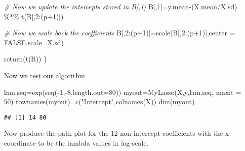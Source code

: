 \documentclass[
]{article}
\newenvironment{Shaded}{\begin{snugshade}}{\end{snugshade}}
\newcommand{\AttributeTok}[1]{\textcolor[rgb]{0.77,0.63,0.00}{#1}}
\newcommand{\CommentTok}[1]{\textcolor[rgb]{0.56,0.35,0.01}{\textit{#1}}}
\newcommand{\ConstantTok}[1]{\textcolor[rgb]{0.00,0.00,0.00}{#1}}
\newcommand{\DecValTok}[1]{\textcolor[rgb]{0.00,0.00,0.81}{#1}}
\newcommand{\FunctionTok}[1]{\textcolor[rgb]{0.00,0.00,0.00}{#1}}
\newcommand{\NormalTok}[1]{#1}
\newcommand{\OtherTok}[1]{\textcolor[rgb]{0.56,0.35,0.01}{#1}}
\newcommand{\SpecialCharTok}[1]{\textcolor[rgb]{0.00,0.00,0.00}{#1}}
\newcommand{\StringTok}[1]{\textcolor[rgb]{0.31,0.60,0.02}{#1}}
\begin{document}
\begin{Shaded}
\begin{Highlighting}[]
  \CommentTok{\# Now we update the intercepts stored in B[,1]}
\NormalTok{  B[,}\DecValTok{1}\NormalTok{]}\OtherTok{=}\NormalTok{y.mean}\SpecialCharTok{{-}}\NormalTok{(X.mean}\SpecialCharTok{/}\NormalTok{X.sd) }\SpecialCharTok{\%*\%} \FunctionTok{t}\NormalTok{(B[,}\DecValTok{2}\SpecialCharTok{:}\NormalTok{(p}\SpecialCharTok{+}\DecValTok{1}\NormalTok{)])}
  
  \CommentTok{\# Now we scale back the coefficients}
\NormalTok{  B[,}\DecValTok{2}\SpecialCharTok{:}\NormalTok{(p}\SpecialCharTok{+}\DecValTok{1}\NormalTok{)]}\OtherTok{=}\FunctionTok{scale}\NormalTok{(B[,}\DecValTok{2}\SpecialCharTok{:}\NormalTok{(p}\SpecialCharTok{+}\DecValTok{1}\NormalTok{)],}\AttributeTok{center =} \ConstantTok{FALSE}\NormalTok{,}\AttributeTok{scale=}\NormalTok{X.sd)}
  
  \FunctionTok{return}\NormalTok{(}\FunctionTok{t}\NormalTok{(B))}
\NormalTok{\}}
\end{Highlighting}
\end{Shaded}

Now we test our algorithm

\begin{Shaded}
\begin{Highlighting}[]
\NormalTok{lam.seq}\OtherTok{=}\FunctionTok{exp}\NormalTok{(}\FunctionTok{seq}\NormalTok{(}\SpecialCharTok{{-}}\DecValTok{1}\NormalTok{,}\SpecialCharTok{{-}}\DecValTok{8}\NormalTok{,}\AttributeTok{length.out=}\DecValTok{80}\NormalTok{))}
\NormalTok{myout}\OtherTok{=}\FunctionTok{MyLasso}\NormalTok{(X,y,lam.seq, }\AttributeTok{maxit =} \DecValTok{50}\NormalTok{)}
\FunctionTok{rownames}\NormalTok{(myout)}\OtherTok{=}\FunctionTok{c}\NormalTok{(}\StringTok{"Intercept"}\NormalTok{,}\FunctionTok{colnames}\NormalTok{(X))}
\FunctionTok{dim}\NormalTok{(myout)}
\end{Highlighting}
\end{Shaded}

\begin{verbatim}
## [1] 14 80
\end{verbatim}

Now produce the path plot for the 12 non-intercept coefficients with the
x-coordinate to be the lambda values in log-scale.
\end{document}
